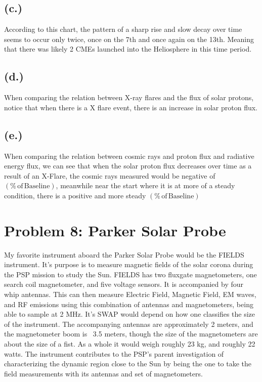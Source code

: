 \documentclass[11pt]{article}
\begin{document}
\subsection*{{(c.)}}
According to this chart, the pattern of a sharp rise and
slow decay over time seems to occur only twice, once on the 7th
and once again on the 13th. Meaning that there was likely 2 CMEs
launched into the Heliosphere in this time period.



\subsection*{{(d.)}}
When comparing the relation between X-ray flares and the flux of
solar protons, notice that when there is a X flare event, there is 
an increase in solar proton flux. 

\subsection*{{(e.)}}
When comparing the relation between cosmic rays and proton flux and
radiative energy flux, we can see that when the solar proton flux decreases
over time as a result of an X-Flare, the cosmic rays measured would be negative
of $(\mathrm{\% \, of\, Baseline})$, meanwhile near the start where it is at more of a 
steady condition, there is a positive and more steady $(\mathrm{\% \, of \, Baseline})$

\section*{Problem 8: Parker Solar Probe}
\hspace*{2em}My favorite instrument aboard the Parker Solar Probe would be the
FIELDS instrument. It's purpose is to measure magnetic fields of the
solar corona during the PSP mission to study the Sun. FIELDS has two fluxgate magnetometers,
one search coil magnetometer, and five voltage sensors. It is accompanied
by four whip antennas. This can then measure Electric Field, Magnetic Field,
EM waves, and RF emissions using this combination of antennas and magnetometers, being able to sample at 2 MHz.
It's SWAP would depend on how one classifies the size of the instrument. The 
accompanying antennas are approximately 2 meters, and the magnetometer boom is ~3.5 meters,
though the size of the magnetometers are about the size of a fist.
As a whole it would weigh roughly 23 kg, and roughly 22 watts. The instrument contributes
to the PSP's parent investigation of characterizing the dynamic region close to the Sun by
being the one to take the field measurements with its antennas and set of magnetometers.
\end{document}
